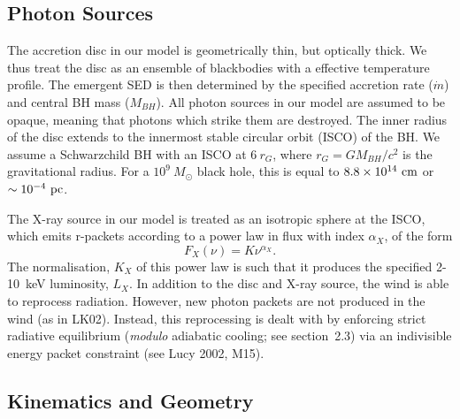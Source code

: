 \documentclass[useAMS,usenatbib]{mn2e_x}
\begin{document}
\subsection{Photon Sources}

The accretion disc in our model is geometrically thin, but optically thick.
We thus treat the disc as an ensemble of blackbodies with a 
\cite{shakurasunyaev1973} effective temperature profile. 
The emergent SED is then determined by the specified accretion rate ($\dot{m}$)
and central BH mass ($M_{BH}$).
All photon sources in our model are assumed to be opaque, meaning
that photons which strike them are destroyed.
The inner radius of the disc extends to the innermost 
stable circular orbit (ISCO) of the BH. 
We assume a Schwarzchild BH with an ISCO at $6~r_G$, where 
$r_G = GM_{BH}/c^2$ is the gravitational radius.
For a $10^9~M_\odot$ black hole, this is equal to $8.8\times10^{14}~{\rm cm}$ 
or $\sim10^{-4}~{\rm pc}$.  


The X-ray source in our model is treated as an isotropic sphere at the ISCO,
which emits r-packets according to a power law in flux with index $\alpha_X$, of the form
\begin{equation}
F_X (\nu) = K \nu^{\alpha_X}.
\end{equation}
The normalisation, $K_X$ of this power law is such that it 
produces the specified 2-10~keV luminosity, $L_X$.
In addition to the disc and X-ray source, 
the wind is able to reprocess radiation. However, new 
photon packets are not produced in the wind (as in LK02). 
Instead, this reprocessing is dealt with by enforcing strict
radiative equilibrium ({\em modulo} adiabatic cooling; see section~2.3)
via an indivisible energy packet
constraint (see Lucy 2002, M15).

\subsection{Kinematics and Geometry}
\end{document}
